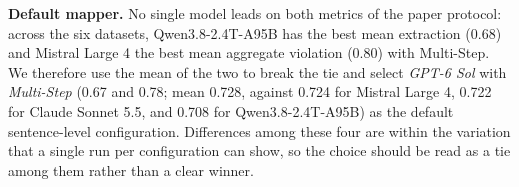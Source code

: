 \smallskip\noindent\textbf{Default mapper.}
No single model leads on both metrics of the paper protocol: across the six
datasets, Qwen3.8-2.4T-A95B has the best mean extraction (0.68) and Mistral
Large 4 the best mean aggregate violation (0.80) with Multi-Step. We therefore use the mean of the two to break the tie and select
\emph{GPT-6 Sol} with \emph{Multi-Step} (0.67 and 0.78; mean 0.728, against 0.724 for
Mistral Large 4, 0.722 for Claude Sonnet 5.5, and 0.708 for Qwen3.8-2.4T-A95B) as the default
sentence-level configuration. Differences among these four are within the variation that a single
run per configuration can show, so the choice should be read as a tie among
them rather than a clear winner.
